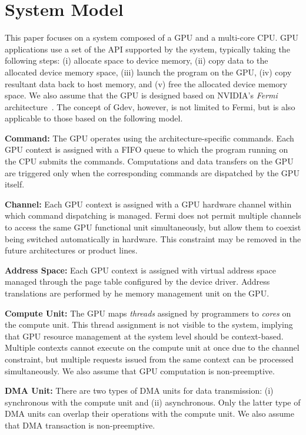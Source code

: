 \vspace{-0.25em}
\section{System Model}
\label{sec:model}
\vspace{-0.25em}

This paper focuses on a system composed of a GPU and a multi-core CPU.
GPU applications use a set of the API supported by the system, typically
taking the following steps:
(i) allocate space to device memory, 
(ii) copy data to the allocated device memory space, 
(iii) launch the program on the GPU, 
(iv) copy resultant data back to host memory, and 
(v) free the allocated device memory space.
We also assume that the GPU is designed based on NVIDIA's \textit{Fermi}
architecture~\cite{Fermi}.
The concept of Gdev, however, is not limited to Fermi, but is also
applicable to those based on the following model.

\textbf{Command:}
The GPU operates using the architecture-specific commands.
Each GPU context is assigned with a FIFO queue to which the program
running on the CPU submits the commands.
Computations and data transfers on the GPU are triggered only when the
corresponding commands are dispatched by the GPU itself.

\textbf{Channel:}
Each GPU context is assigned with a GPU hardware channel within which
command dispatching is managed.
Fermi does not permit multiple channels to access the
same GPU functional unit simultaneously, but allow them to coexist being
switched automatically in hardware.
This constraint may be removed in the future architectures or product lines.

\textbf{Address Space:}
Each GPU context is assigned with virtual address space managed through
the page table configured by the device driver.
Address translations are performed by he memory management unit on the
GPU.

\begin{comment}
\textbf{I/O Register:}
The GPU provides a bunch of memory-mapped I/O registers per context
visible to the device driver through the (PCI) I/O bus.
The device driver needs to manage these registers to send commands and
set up channels and address space.
\end{comment}

\textbf{Compute Unit:}
The GPU maps \textit{threads} assigned by programmers to \textit{cores}
on the compute unit.
This thread assignment is not visible to the system, implying that GPU
resource management at the system level should be context-based. 
Multiple contexts cannot execute on the compute unit at once due to the
channel constraint, but multiple requests issued from the same context
can be processed simultaneously.
We also assume that GPU computation is non-preemptive.

\textbf{DMA Unit:}
There are two types of DMA units for data transmission: (i) synchronous
with the compute unit and (ii) asynchronous.
Only the latter type of DMA units can overlap their operations with the
compute unit.
We also assume that DMA transaction is non-preemptive.
